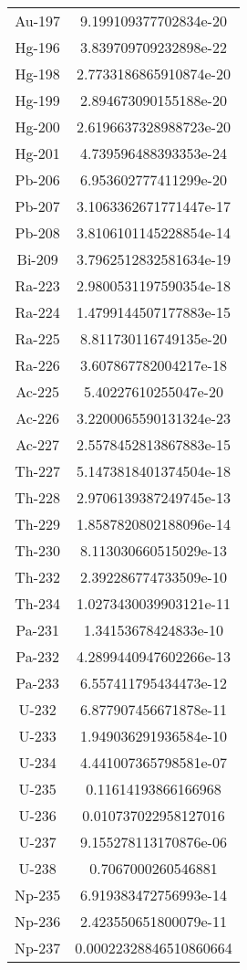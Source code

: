 \begin{table}[h!]
\begin{tabular}{|| c || c |}
Au-197 & 9.199109377702834e-20 \\
Hg-196 & 3.839709709232898e-22 \\
Hg-198 & 2.7733186865910874e-20 \\
Hg-199 & 2.894673090155188e-20 \\
Hg-200 & 2.6196637328988723e-20 \\
Hg-201 & 4.739596488393353e-24 \\
Pb-206 & 6.953602777411299e-20 \\
Pb-207 & 3.1063362671771447e-17 \\
Pb-208 & 3.8106101145228854e-14 \\
Bi-209 & 3.7962512832581634e-19 \\
Ra-223 & 2.9800531197590354e-18 \\
Ra-224 & 1.4799144507177883e-15 \\
Ra-225 & 8.811730116749135e-20 \\
Ra-226 & 3.607867782004217e-18 \\
Ac-225 & 5.40227610255047e-20 \\
Ac-226 & 3.2200065590131324e-23 \\
Ac-227 & 2.5578452813867883e-15 \\
Th-227 & 5.1473818401374504e-18 \\
Th-228 & 2.9706139387249745e-13 \\
Th-229 & 1.8587820802188096e-14 \\
Th-230 & 8.113030660515029e-13 \\
Th-232 & 2.392286774733509e-10 \\
Th-234 & 1.0273430039903121e-11 \\
Pa-231 & 1.34153678424833e-10 \\
Pa-232 & 4.2899440947602266e-13 \\
Pa-233 & 6.557411795434473e-12 \\
U-232 & 6.877907456671878e-11 \\
U-233 & 1.949036291936584e-10 \\
U-234 & 4.441007365798581e-07 \\
U-235 & 0.11614193866166968 \\
U-236 & 0.010737022958127016 \\
U-237 & 9.155278113170876e-06 \\
U-238 & 0.7067000260546881 \\
Np-235 & 6.919383472756993e-14 \\
Np-236 & 2.423550651800079e-11 \\
Np-237 & 0.00022328846510860664 \\

\end{tabular}
\end{table}

